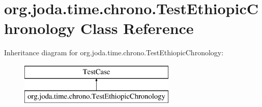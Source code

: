 \hypertarget{classorg_1_1joda_1_1time_1_1chrono_1_1_test_ethiopic_chronology}{\section{org.\-joda.\-time.\-chrono.\-Test\-Ethiopic\-Chronology Class Reference}
\label{classorg_1_1joda_1_1time_1_1chrono_1_1_test_ethiopic_chronology}
}
Inheritance diagram for org.\-joda.\-time.\-chrono.\-Test\-Ethiopic\-Chronology\-:\begin{figure}[H]
\begin{center}
\leavevmode
\includegraphics[height=2.000000cm]{classorg_1_1joda_1_1time_1_1chrono_1_1_test_ethiopic_chronology}
\end{center}
\end{figure}
